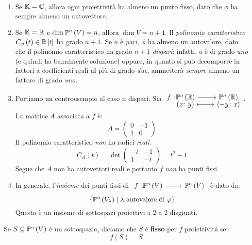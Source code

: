 \begin{observe}~{}
	\begin{enumerate}
		\item Se $\mathbb{K}=\mathbb{C}$, allora ogni proiettività ha almeno un punto fisso, dato che $\phi$ ha sempre almeno un autovettore.
		\item Se $\mathbb{K}=\mathbb{R}$ e $\dim\proj{V}=n$, allora $\dim V=n+1$. Il \textit{polinomio caratteristico} $C_\varphi\left(t\right)\in\mathbb{R}\left[t\right]$ ha grado $n+1$. Se $n$ è \textit{pari}, $\phi$ ha almeno un autovalore, dato che il polinomio caratteristico ha grado $n+1$ \textit{dispari}: infatti, o è di grado \textit{uno} (e quindi ha banalmente soluzione) oppure, in quanto si può decomporre in fattori a coefficienti reali al più di grado \textit{due}, ammetterà \textit{sempre} almeno un fattore di grado \textit{uno}.
		\item Portiamo un controesempio al caso $n$ dispari. Sia $\funztot{f}{\proj{\realset}}{\proj{\realset}}{\left(x\colon y\right)}{\left(-y\colon x\right)}$. La matrice $A$ associata a $f$ è:
		\begin{equation*}
			A=\left(\begin{array}{cc}
				0 & -1 \\ 
				1 & 0
			\end{array}\right)
		\end{equation*}
	Il polinomio caratteristico \textit{non} ha radici \textit{reali}:
	\begin{equation*}
		C_A\left(t\right)=\det\left(\begin{array}{cc}
			-t & -1 \\ 
			1 & -t
		\end{array}\right)=t^2-1
	\end{equation*}
Segue che $A$ non ha autovettori reali e pertanto $f$ \textit{non} ha punti fissi.
\item In generale, l'\textit{insieme} dei punti fissi di $\funz{f}{\proj{V}}{\proj{V}}$ è dato da:
\begin{equation*}
	\left\{\proj{V_{\lambda}}\mid\lambda\text{ autovalore di }\phi\right\}
\end{equation*}
Questo è un insieme di sottospazi proiettivi a 2 a 2 disgiunti.
 	\end{enumerate}
\end{observe}
\begin{define}
	Se $S\subseteq\proj{V}$ è un sottospazio, diciamo che $S$ è \textbf{fisso} per $f$ proiettività se:
		\begin{equation}
		f\left(S\right)=S
	\end{equation}
	\vspace{-6mm}
\end{define}
